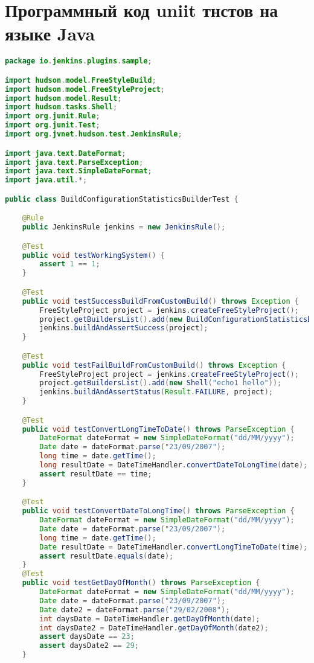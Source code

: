 \chapter{Программный код uniit тнстов на языке Java}\label{appendix-extra-examples}

\begin{lstlisting}[language=Java]
package io.jenkins.plugins.sample;

import hudson.model.FreeStyleBuild;
import hudson.model.FreeStyleProject;
import hudson.model.Result;
import hudson.tasks.Shell;
import org.junit.Rule;
import org.junit.Test;
import org.jvnet.hudson.test.JenkinsRule;

import java.text.DateFormat;
import java.text.ParseException;
import java.text.SimpleDateFormat;
import java.util.*;

public class BuildConfigurationStatisticsBuilderTest {

    @Rule
    public JenkinsRule jenkins = new JenkinsRule();

    @Test
    public void testWorkingSystem() {
        assert 1 == 1;
    }

    @Test
    public void testSuccessBuildFromCustomBuild() throws Exception {
        FreeStyleProject project = jenkins.createFreeStyleProject();
        project.getBuildersList().add(new BuildConfigurationStatisticsBuilder());
        jenkins.buildAndAssertSuccess(project);
    }

    @Test
    public void testFailBuildFromCustomBuild() throws Exception {
        FreeStyleProject project = jenkins.createFreeStyleProject();
        project.getBuildersList().add(new Shell("echo1 hello"));
        jenkins.buildAndAssertStatus(Result.FAILURE, project);
    }

    @Test
    public void testConvertLongTimeToDate() throws ParseException {
        DateFormat dateFormat = new SimpleDateFormat("dd/MM/yyyy");
        Date date = dateFormat.parse("23/09/2007");
        long time = date.getTime();
        long resultDate = DateTimeHandler.convertDateToLongTime(date);
        assert resultDate == time;
    }

    @Test
    public void testConvertDateToLongTime() throws ParseException {
        DateFormat dateFormat = new SimpleDateFormat("dd/MM/yyyy");
        Date date = dateFormat.parse("23/09/2007");
        long time = date.getTime();
        Date resultDate = DateTimeHandler.convertLongTimeToDate(time);
        assert resultDate.equals(date);
    }
    @Test
    public void testGetDayOfMonth() throws ParseException {
        DateFormat dateFormat = new SimpleDateFormat("dd/MM/yyyy");
        Date date = dateFormat.parse("23/09/2007");
        Date date2 = dateFormat.parse("29/02/2008");
        int daysDate = DateTimeHandler.getDayOfMonth(date);
        int daysDate2 = DateTimeHandler.getDayOfMonth(date2);
        assert daysDate == 23;
        assert daysDate2 == 29;
    }


\end{lstlisting}
